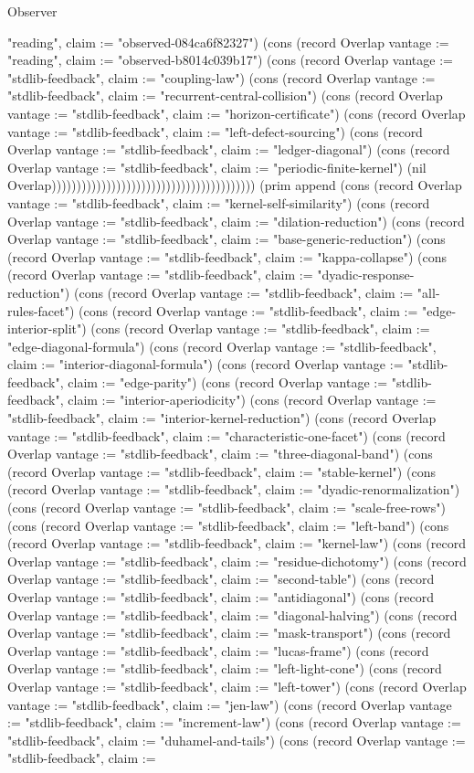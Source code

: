 \begin{lexlean}{Observer}
\begin{semanticmodule}
{"reading", claim := "observed-084ca6f82327"}) (cons (record Overlap {vantage := "reading", claim := "observed-b8014c039b17"}) (cons (record Overlap {vantage := "stdlib-feedback", claim := "coupling-law"}) (cons (record Overlap {vantage := "stdlib-feedback", claim := "recurrent-central-collision"}) (cons (record Overlap {vantage := "stdlib-feedback", claim := "horizon-certificate"}) (cons (record Overlap {vantage := "stdlib-feedback", claim := "left-defect-sourcing"}) (cons (record Overlap {vantage := "stdlib-feedback", claim := "ledger-diagonal"}) (cons (record Overlap {vantage := "stdlib-feedback", claim := "periodic-finite-kernel"}) (nil Overlap))))))))))))))))))))))))))))))))))))))))) (prim append (cons (record Overlap {vantage := "stdlib-feedback", claim := "kernel-self-similarity"}) (cons (record Overlap {vantage := "stdlib-feedback", claim := "dilation-reduction"}) (cons (record Overlap {vantage := "stdlib-feedback", claim := "base-generic-reduction"}) (cons (record Overlap {vantage := "stdlib-feedback", claim := "kappa-collapse"}) (cons (record Overlap {vantage := "stdlib-feedback", claim := "dyadic-response-reduction"}) (cons (record Overlap {vantage := "stdlib-feedback", claim := "all-rules-facet"}) (cons (record Overlap {vantage := "stdlib-feedback", claim := "edge-interior-split"}) (cons (record Overlap {vantage := "stdlib-feedback", claim := "edge-diagonal-formula"}) (cons (record Overlap {vantage := "stdlib-feedback", claim := "interior-diagonal-formula"}) (cons (record Overlap {vantage := "stdlib-feedback", claim := "edge-parity"}) (cons (record Overlap {vantage := "stdlib-feedback", claim := "interior-aperiodicity"}) (cons (record Overlap {vantage := "stdlib-feedback", claim := "interior-kernel-reduction"}) (cons (record Overlap {vantage := "stdlib-feedback", claim := "characteristic-one-facet"}) (cons (record Overlap {vantage := "stdlib-feedback", claim := "three-diagonal-band"}) (cons (record Overlap {vantage := "stdlib-feedback", claim := "stable-kernel"}) (cons (record Overlap {vantage := "stdlib-feedback", claim := "dyadic-renormalization"}) (cons (record Overlap {vantage := "stdlib-feedback", claim := "scale-free-rows"}) (cons (record Overlap {vantage := "stdlib-feedback", claim := "left-band"}) (cons (record Overlap {vantage := "stdlib-feedback", claim := "kernel-law"}) (cons (record Overlap {vantage := "stdlib-feedback", claim := "residue-dichotomy"}) (cons (record Overlap {vantage := "stdlib-feedback", claim := "second-table"}) (cons (record Overlap {vantage := "stdlib-feedback", claim := "antidiagonal"}) (cons (record Overlap {vantage := "stdlib-feedback", claim := "diagonal-halving"}) (cons (record Overlap {vantage := "stdlib-feedback", claim := "mask-transport"}) (cons (record Overlap {vantage := "stdlib-feedback", claim := "lucas-frame"}) (cons (record Overlap {vantage := "stdlib-feedback", claim := "left-light-cone"}) (cons (record Overlap {vantage := "stdlib-feedback", claim := "left-tower"}) (cons (record Overlap {vantage := "stdlib-feedback", claim := "jen-law"}) (cons (record Overlap {vantage := "stdlib-feedback", claim := "increment-law"}) (cons (record Overlap {vantage := "stdlib-feedback", claim := "duhamel-and-tails"}) (cons (record Overlap {vantage := "stdlib-feedback", claim := }
\end{semanticmodule}
\end{lexlean}
